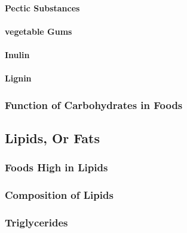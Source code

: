 \paragraph*{Pectic Substances}
\paragraph*{vegetable Gums}
\paragraph*{Inulin}
\paragraph*{Lignin}

\subsubsection*{Function of Carbohydrates in Foods}

\subsection{Lipids, Or Fats}

\subsubsection*{Foods High in Lipids}

\subsubsection*{Composition of Lipids}

\subsubsection*{Triglycerides}


